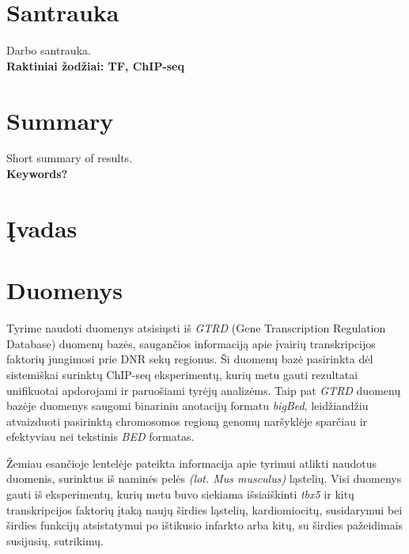 \documentclass[12pt]{article}
\begin{document}
\section*{Santrauka}
Darbo santrauka.\\

\textbf{Raktiniai žodžiai: TF, ChIP-seq}
\newpage

\section*{Summary}
Short summary of results.\\

\textbf{Keywords?}
\newpage

\section{Įvadas}
\newpage

\section{Duomenys}

Tyrime naudoti duomenys atsisiųsti iš \emph{GTRD} (Gene Transcription
Regulation Database) duomenų bazės, saugančios informaciją apie įvairių
transkripcijos faktorių jungimosi prie DNR sekų regionus. Ši duomenų
bazė pasirinkta dėl sistemiškai surinktų ChIP-seq eksperimentų, kurių
metu gauti rezultatai unifikuotai apdorojami ir paruošiami tyrėjų
analizėms. Taip pat \emph{GTRD} duomenų bazėje duomenys saugomi
binariniu anotacijų formatu \emph{bigBed}, leidžiandžiu atvaizduoti
pasirinktą chromosomos regioną genomų naršyklėje sparčiau ir 
efektyviau nei tekstinis \emph{BED} formatas.

Žemiau esančioje lentelėje pateikta informacija apie tyrimui atlikti
naudotus duomenis, surinktus iš naminės pelės \emph{(lot. Mus musculus)}
ląstelių. Visi duomenys gauti iš eksperimentų, kurių metu buvo
siekiama išsiaiškinti \emph{tbx5} ir kitų transkripcijos faktorių
įtaką naujų širdies ląstelių, kardiomiocitų, susidarymui bei širdies
funkcijų atsistatymui po ištikusio infarkto arba kitų, su širdies
pažeidimais susijusių, sutrikimų.
\end{document}
